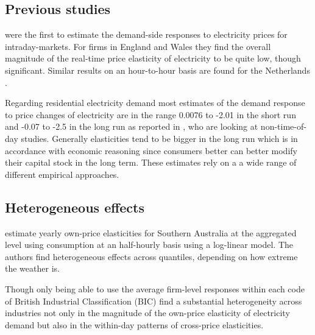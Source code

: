 \subsection{Previous studies}
\label{subsec:b_results}
\citet{patrick2001estimating} were the first to estimate the demand-side responses to electricity prices for intraday-markets. For firms in England and Wales they find the overall magnitude of the real-time price elasticity of electricity to be quite low, though significant. Similar results on an hour-to-hour basis are found for the Netherlands \citep{lijesen2007real}. \par
Regarding residential electricity demand most estimates of the demand response to price changes of electricity are in the range 0.0076 to -2.01 in the short run and -0.07 to -2.5 in the long run as reported in \citet{espey2004turning}, who are looking at non-time-of-day studies. Generally elasticities tend to be bigger in the long run which is in accordance with economic reasoning since consumers better can better modify their capital stock in the long term. These estimates rely on a a wide range of different empirical approaches.

\subsection{Heterogeneous effects}
\label{subsec:b_heterogeneity}
\citet{fan2011price} estimate yearly own-price elasticities for Southern Australia at the aggregated level using consumption at an half-hourly basis using a log-linear model. The authors find heterogeneous effects across quantiles, depending on how extreme the weather is. \par
Though only being able to use the average firm-level responses within each code of British Industrial Classification (BIC) \citet{patrick2001estimating} find a substantial heterogeneity across industries not only in the magnitude of the own-price elasticity of electricity demand but also in the within-day patterns of cross-price elasticities.

